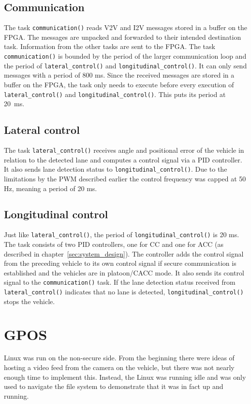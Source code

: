 \subsection{Communication}
The task \texttt{communication()} reads V2V and I2V messages stored in a buffer on the FPGA. The messages are unpacked and forwarded to their intended destination task. Information from the other tasks are sent to the FPGA. The task \texttt{communication()} is bounded by the period of the larger communication loop and the period of \texttt{lateral\_control()} and \texttt{longitudinal\_control()}. It can only send messages with a period of 800 ms. Since the received messages are stored in a buffer on the FPGA, the task only needs to execute before every execution of \texttt{lateral\_control()} and \texttt{longitudinal\_control()}. This puts its period at 20~ms.

\subsection{Lateral control}
The task \texttt{lateral\_control()} receives angle and positional error of the vehicle in relation to the detected lane and computes a control signal via a PID controller. It also sends lane detection status to \texttt{longitudinal\_control()}. Due to the limitations by the PWM described earlier the control frequency was capped at 50 Hz, meaning a period of 20 ms.

\subsection{Longitudinal control}
Just like \texttt{lateral\_control()}, the period of \texttt{longitudinal\_control()} is 20 ms. The task consists of two PID controllers, one for CC and one for ACC (as described in chapter~\ref{sec:system_design}). The controller adds the control signal from the preceding vehicle to its own control signal if secure communication is established and the vehicles are in platoon/CACC mode. It also sends its control signal to the \texttt{communication()} task. If the lane detection status received from \texttt{lateral\_control()} indicates that no lane is detected, \texttt{longitudinal\_control()} stops the vehicle.

\section{GPOS}
Linux was run on the non-secure side. From the beginning there were ideas of hosting a video feed from the camera on the vehicle, but there was not nearly enough time to implement this. Instead, the Linux was running idle and was only used to navigate the file system to demonstrate that it was in fact up and running. 

